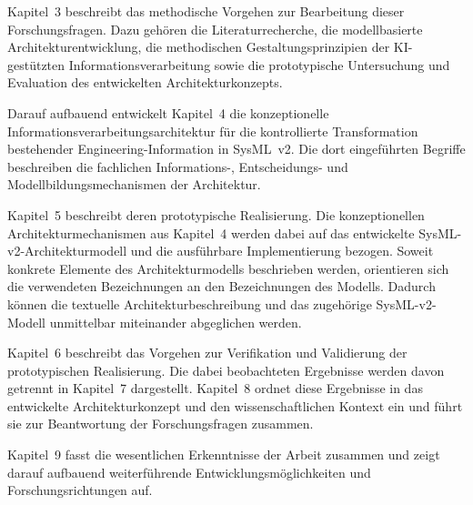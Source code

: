 Kapitel~3 beschreibt das methodische Vorgehen zur Bearbeitung dieser
Forschungsfragen. Dazu gehören die Literaturrecherche, die modellbasierte
Architekturentwicklung, die methodischen Gestaltungsprinzipien der
KI-gestützten Informationsverarbeitung sowie die prototypische Untersuchung
und Evaluation des entwickelten Architekturkonzepts.

Darauf aufbauend entwickelt Kapitel~4 die konzeptionelle
Informationsverarbeitungsarchitektur für die kontrollierte Transformation
bestehender Engineering-Information in SysML~v2. Die dort eingeführten
Begriffe beschreiben die fachlichen Informations-, Entscheidungs- und
Modellbildungsmechanismen der Architektur.

Kapitel~5 beschreibt deren prototypische Realisierung. Die konzeptionellen
Architekturmechanismen aus Kapitel~4 werden dabei auf das entwickelte
SysML-v2-Architekturmodell und die ausführbare Implementierung bezogen.
Soweit konkrete Elemente des Architekturmodells beschrieben werden,
orientieren sich die verwendeten Bezeichnungen an den Bezeichnungen des
Modells. Dadurch können die textuelle Architekturbeschreibung und das
zugehörige SysML-v2-Modell unmittelbar miteinander abgeglichen werden.

Kapitel~6 beschreibt das Vorgehen zur Verifikation und Validierung der
prototypischen Realisierung. Die dabei beobachteten Ergebnisse werden davon
getrennt in Kapitel~7 dargestellt. Kapitel~8 ordnet diese Ergebnisse in das
entwickelte Architekturkonzept und den wissenschaftlichen Kontext ein und
führt sie zur Beantwortung der Forschungsfragen zusammen.

Kapitel~9 fasst die wesentlichen Erkenntnisse der Arbeit zusammen und zeigt
darauf aufbauend weiterführende Entwicklungsmöglichkeiten und
Forschungsrichtungen auf.